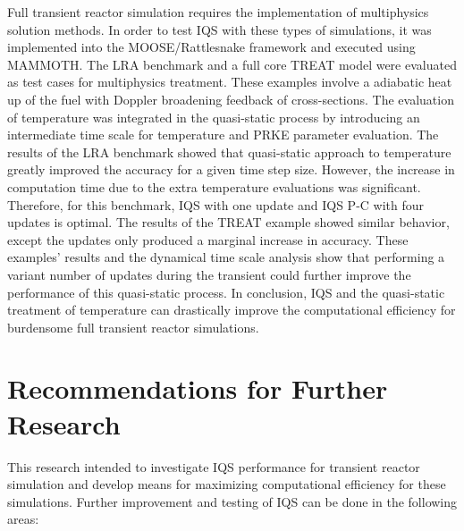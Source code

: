 Full transient reactor simulation requires the implementation of multiphysics solution methods. In order to test IQS with these types of simulations, it was implemented into the MOOSE/Rattlesnake framework and executed using MAMMOTH. The LRA benchmark and a full core TREAT model were evaluated as test cases for multiphysics treatment. These examples involve a adiabatic heat up of the fuel with Doppler broadening feedback of cross-sections. The evaluation of temperature was integrated in the quasi-static process by introducing an intermediate time scale for temperature and PRKE parameter evaluation. The results of the LRA benchmark showed that quasi-static approach to temperature greatly improved the accuracy for a given time step size. However, the increase in computation time due to the extra temperature evaluations was significant. Therefore, for this benchmark, IQS with one update and IQS P-C with four updates is optimal. The results of the TREAT example showed similar behavior, except the updates only produced a marginal increase in accuracy. These examples' results and the dynamical time scale analysis show that performing a variant number of updates during the transient could further improve the performance of this quasi-static process. In conclusion, IQS and the quasi-static treatment of temperature can drastically improve the computational efficiency for burdensome full transient reactor simulations.

\section{Recommendations for Further Research}

This research intended to investigate IQS performance for transient reactor simulation and develop means for maximizing computational efficiency for these simulations. Further improvement and testing of IQS can be done in the following areas:

